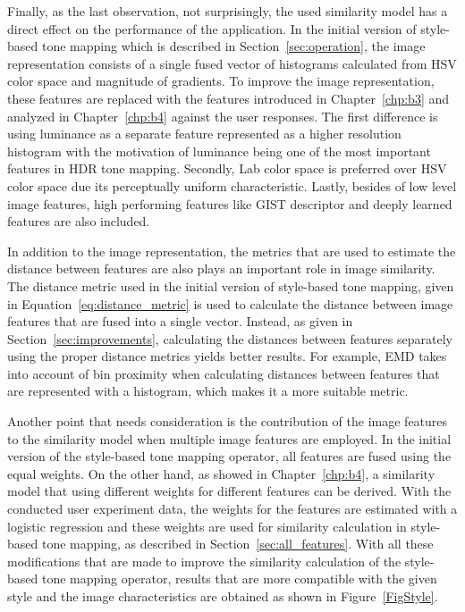Finally, as the last observation, not surprisingly, the used similarity model has a direct effect on the performance of the application. In the initial version of style-based tone mapping which is described in Section~\ref{sec:operation}, the image representation consists of a single fused vector of histograms calculated from HSV color space and magnitude of gradients. To improve the image representation, these features are replaced with the features introduced in Chapter~\ref{chp:b3} and analyzed in Chapter~\ref{chp:b4} against the user responses. The first difference is using luminance as a separate feature represented as a higher resolution histogram with the motivation of luminance being one of the most important features in HDR tone mapping. Secondly, Lab color space is preferred over HSV color space due its perceptually uniform characteristic. Lastly, besides of low level image features, high performing features like GIST descriptor and deeply learned features are also included.

In addition to the image representation, the metrics that are used to estimate the distance between features are also plays an important role in image similarity. The distance metric used in the initial version of style-based tone mapping, given in Equation~\ref{eq:distance_metric} is used to calculate the distance between image features that are fused into a single vector. Instead, as given in Section~\ref{sec:improvements}, calculating the distances between features separately using the proper distance metrics yields better results. For example, EMD takes into account of bin proximity when calculating distances between features that are represented with a histogram, which makes it a more suitable metric.

Another point that needs consideration is the contribution of the image features to the similarity model when multiple image features are employed. In the initial version of the style-based tone mapping operator, all features are fused using the equal weights. On the other hand, as showed in Chapter~\ref{chp:b4}, a similarity model that using different weights for different features can be derived. With the conducted user experiment data, the weights for the features are estimated with a logistic regression and these weights are used for similarity calculation in style-based tone mapping, as described in Section~\ref{sec:all_features}. With all these modifications that are made to improve the similarity calculation of the style-based tone mapping operator, results that are more compatible with the given style and the image characteristics are obtained as shown in Figure~\ref{FigStyle}. 

